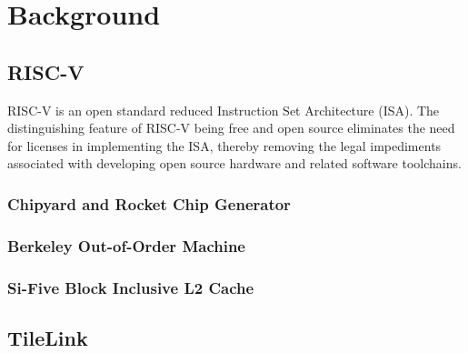 \section{Background}
\label{sec:background}

\subsection{RISC-V}
RISC-V\cite{Waterman:Riscv:2011} is an open standard reduced Instruction Set Architecture (ISA). The distinguishing feature of RISC-V being free and open source eliminates the need for licenses in implementing the ISA, thereby removing the legal impediments associated with developing open source hardware and related software toolchains.

\subsubsection{Chipyard and Rocket Chip Generator}

\subsubsection{Berkeley Out-of-Order Machine}

\subsubsection{Si-Five Block Inclusive L2 Cache}

\subsection{TileLink}

\subsection{}
